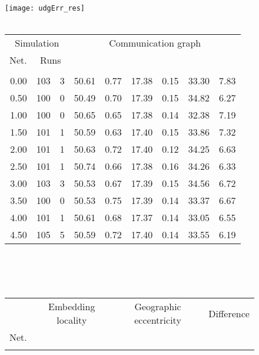\documentclass{article}
\begin{document}
\begin{figure}[h]
\begin{center}
\texttt{[image: udgErr\_res]}
~\\~\\
\begin{tabular}{|r|rr|rr|rr|rr|}
\hline
\multicolumn{3}{|c|}{Simulation} & \multicolumn{6}{|c|}{Communication graph}\\
\multicolumn{1}{|c}{Net.} & \multicolumn{2}{c|}{Runs} & \multicolumn{2}{|c}{} & \multicolumn{2}{c}{} & \multicolumn{2}{c|}{}\\
\hline
\multicolumn{1}{|c|}{} & \multicolumn{1}{|c}{} & \multicolumn{1}{c|}{} & \multicolumn{1}{|c}{} & \multicolumn{1}{c|}{} & \multicolumn{1}{|c}{} & \multicolumn{1}{c|}{} & \multicolumn{1}{|c}{} & \multicolumn{1}{c|}{}\\
0.00 & 103 & 3 & 50.61 & 0.77 & 17.38 & 0.15 & 33.30 & 7.83\\
0.50 & 100 & 0 & 50.49 & 0.70 & 17.39 & 0.15 & 34.82 & 6.27\\
1.00 & 100 & 0 & 50.65 & 0.65 & 17.38 & 0.14 & 32.38 & 7.19\\
1.50 & 101 & 1 & 50.59 & 0.63 & 17.40 & 0.15 & 33.86 & 7.32\\
2.00 & 101 & 1 & 50.63 & 0.72 & 17.40 & 0.12 & 34.25 & 6.63\\
2.50 & 101 & 1 & 50.74 & 0.66 & 17.38 & 0.16 & 34.26 & 6.33\\
3.00 & 103 & 3 & 50.53 & 0.67 & 17.39 & 0.15 & 34.56 & 6.72\\
3.50 & 100 & 0 & 50.53 & 0.75 & 17.39 & 0.14 & 33.37 & 6.67\\
4.00 & 101 & 1 & 50.61 & 0.68 & 17.37 & 0.14 & 33.05 & 6.55\\
4.50 & 105 & 5 & 50.59 & 0.72 & 17.40 & 0.14 & 33.55 & 6.19\\
\hline
\end{tabular}\\
~\\~\\
\begin{tabular}{|r|rr|rr|rr|rr|rr|}
\hline
& \multicolumn{4}{|c|}{Embedding locality} & \multicolumn{4}{|c|}{Geographic eccentricity} & \multicolumn{2}{|c|}{Difference}\\
Net. & \multicolumn{2}{c}{} & \multicolumn{2}{c|}{} & \multicolumn{2}{c}{} & \multicolumn{2}{c|}{}&  & \\
\hline
\multicolumn{1}{|c|}{} & \multicolumn{1}{|c}{} & \multicolumn{1}{c|}{} & \multicolumn{1}{|c}{} & \multicolumn{1}{c|}{} & \multicolumn{1}{|c}{} & \multicolumn{1}{c|}{} & \multicolumn{1}{|c}{} & \multicolumn{1}{c|}{} & \multicolumn{1}{|c}{} & \multicolumn{1}{c|}{}\\

\end{tabular}
\end{center}
\end{figure}
\end{document}
